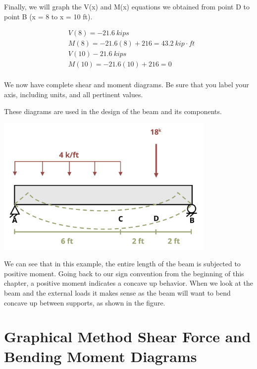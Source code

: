 \documentclass[
  letterpaper,
  DIV=11,
  numbers=noendperiod]{scrreprt}
\begin{document}
\begin{tcolorbox}
\begin{tcolorbox}
Finally, we will graph the V(x) and M(x) equations we obtained from
point D to point B (x = 8 to x = 10 ft).

\[
\begin{aligned}
&V(8)=-21.6{~kips} \\
&M(8)=-21.6(8)+216=43.2{~kip}\cdot{ft} \\
&V(10)-21.6{~kips} \\
&M(10)=-21.6(10)+216=0 \\
\end{aligned}
\]

We now have complete shear and moment diagrams. Be sure that you label
your axis, including units, and all pertinent values.

These diagrams are used in the design of the beam and its components.

\begin{center}
\includegraphics[width=4.1875in,height=\textheight]{images/CH7 PNGs/example 7.2 part 10.png}
\end{center}

We can see that in this example, the entire length of the beam is
subjected to positive moment. Going back to our sign convention from the
beginning of this chapter, a positive moment indicates a concave up
behavior. When we look at the beam and the external loads it makes sense
as the beam will want to bend concave up between supports, as shown in
the figure.

\end{tcolorbox}

\end{tcolorbox}

\section{Graphical Method Shear Force and Bending Moment
Diagrams}\label{sec-7.4}
\end{document}
